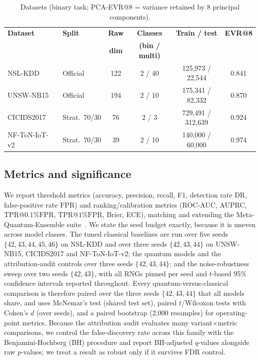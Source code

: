 \documentclass[preprint,11pt]{elsarticle}
\newcommand{\tpr}{\mathrm{TPR}}
\newcommand{\fpr}{\mathrm{FPR}}
\begin{document}
\begin{table}[t]
\centering
\caption{Datasets (binary task; PCA-EVR@8 = variance retained by 8 principal components).}
\label{tab:data}
\footnotesize
\renewcommand{\arraystretch}{1.15}
\setlength{\tabcolsep}{4pt}
\begin{tabular}{@{}llcccc@{}}
\toprule
\textbf{Dataset} & \textbf{Split} & \textbf{Raw} & \textbf{Classes} & \textbf{Train / test} & \textbf{EVR@8}\\
                 &                & \textbf{dim} & \textbf{(bin / multi)} & & \\
\midrule
NSL-KDD~\cite{nslkdd2009}    & Official      & 122 & 2 / 40 & 125{,}973 / 22{,}544  & 0.841\\
UNSW-NB15~\cite{unswnb15}    & Official      & 194 & 2 / 10 & 175{,}341 / 82{,}332  & 0.870\\
CICIDS2017~\cite{cicids2017} & Strat.\ 70/30 &  76 & 2 / 3  & 729{,}491 / 312{,}639 & 0.924\\
NF-ToN-IoT-v2~\cite{toniot}  & Strat.\ 70/30 &  39 & 2 / 10 & 140{,}000 / 60{,}000  & 0.974\\
\bottomrule
\end{tabular}
\end{table}

\subsection{Metrics and significance}\label{sec:metrics}
We report threshold metrics (accuracy, precision, recall, F1, detection rate DR, false-positive rate
$\fpr$) and ranking/calibration metrics (ROC-AUC, AUPRC, $\tpr$@$0.1\%\fpr$, $\tpr$@$1\%\fpr$, Brier,
ECE), matching and extending the Meta-Quantum-Ensemble suite~\cite{bhatnagar2026mqe}. We state the
seed budget exactly, because it is uneven across model classes. The tuned classical baselines are run
over five seeds $\{42,43,44,45,46\}$ on NSL-KDD and over three seeds $\{42,43,44\}$ on UNSW-NB15,
CICIDS2017 and NF-ToN-IoT-v2; the quantum models and the attribution-audit controls over three seeds
$\{42,43,44\}$; and the noise-robustness sweep over two seeds $\{42,43\}$, with all RNGs pinned per
seed and $t$-based 95\% confidence intervals reported throughout. Every quantum-versus-classical
comparison is therefore paired over the three seeds $\{42,43,44\}$ that all models share, and uses
McNemar's
test (shared test set), paired $t$/Wilcoxon tests with Cohen's $d$ (over seeds), and a paired bootstrap
(2{,}000 resamples) for operating-point metrics. Because the attribution audit evaluates many
variant$\times$metric comparisons, we control the false-discovery rate across this family with the
Benjamini-Hochberg (BH) procedure and report BH-adjusted $q$-values alongside raw $p$-values; we treat
a result as robust only if it survives FDR control.
\end{document}
